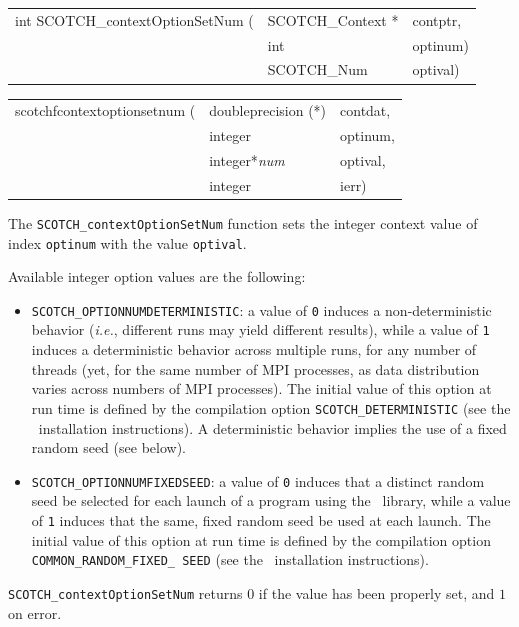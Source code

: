 \begin{itemize}
\progsyn

{\tt\begin{tabular}{l@{}ll}
int SCOTCH\_contextOptionSetNum ( & SCOTCH\_Context * & contptr, \\
                                  & int               & optinum) \\
                                  & SCOTCH\_Num       & optival)
\end{tabular}}

{\tt\begin{tabular}{l@{}ll}
scotchfcontextoptionsetnum ( & doubleprecision (*) & contdat, \\
                             & integer             & optinum, \\
                             & integer*{\it num}   & optival, \\
                             & integer             & ierr)
\end{tabular}}

\progdes

The \texttt{SCOTCH\_contextOptionSetNum} function sets the integer
context value of index \texttt{optinum} with the value
\texttt{optival}.

Available integer option values are the following:
\begin{itemize}
\item \texttt{SCOTCH\_\lbt OPTIONNUMDETERMINISTIC}: a value of
  \texttt{0} induces a non-deterministic behavior (\textit{i.e.},
  different runs may yield different results), while a value of
  \texttt{1} induces a deterministic behavior across multiple runs,
  for any number of threads (yet, for the same number of MPI
  processes, as data distribution varies across numbers of MPI
  processes). The initial value of this option at run time is defined
  by the compilation option \texttt{SCOTCH\_\lbt DETERMINISTIC} (see
  the \scotch\ installation instructions). A deterministic behavior
  implies the use of a fixed random seed (see below).
\item \texttt{SCOTCH\_\lbt OPTIONNUMFIXEDSEED}: a value of
  \texttt{0} induces that a distinct random seed be selected for each
  launch of a program using the \libscotch\ library, while a value of
  \texttt{1} induces that the same, fixed random seed be used at each
  launch. The initial value of this option at run time is defined by
  the compilation option \texttt{COMMON\_\lbt RANDOM\_\lbt FIXED\_\lbt
  SEED} (see the \scotch\ installation instructions).
\end{itemize}

\progret

\texttt{SCOTCH\_contextOptionSetNum} returns $0$ if the value has
been properly set, and $1$ on error.
\end{itemize}

